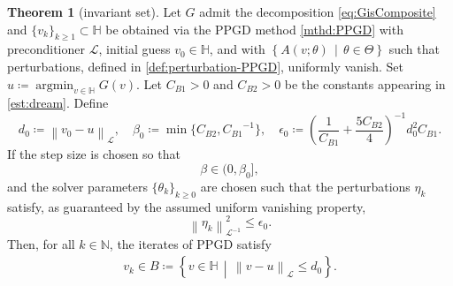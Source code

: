 \documentclass{amsart}
\DeclareMathOperator*{\argmin}{argmin}
\newcommand{\polN}{\mathbb N}
\newcommand{\vk}{{v_{k}}}
\newcommand{\LL}{\mathcal{L}}
\newcommand{\LLinv}{{\mathcal{L}^{-1}}}
\newcommand{\norm}[2]{\left\| #1 \right\| _{#2}}
\newcommand{\HH}{\mathbb{H}}
\newcommand{\s}{{\beta}}	%
\newcommand{\CdvB}{{C_{B1}}} %
\newcommand{\CddB}{{C_{B2}}} %
\theoremstyle{definition}
\newtheorem{thm}{Theorem}[section]
\begin{document}
	\begin{thm}[invariant set]
	\label{thm:invariant-set}
Let $G$ admit the decomposition \eqref{eq:GisComposite} and $\{v_k\}_{k\ge1} \subset \HH$ be obtained via the PPGD method \eqref{mthd:PPGD} with preconditioner $\LL$, initial guess $v_0\in \HH$, and with $\left\{A(v;\theta) \, \middle| \, \theta\in \Theta \right\}$ such that perturbations, defined in \eqref{def:perturbation-PPGD}, uniformly vanish. Set $u \coloneqq \argmin_{v\in\HH}G(v)$. Let $\CdvB>0$ and $\CddB>0$ be the constants appearing in \eqref{est:dream}. Define
	\[
d_0 \coloneqq \norm{v_0 - u}{\LL}, \quad \s_0 \coloneqq  \min\{\CddB, \CdvB^{-1} \} , \quad \epsilon_0 \coloneqq \left(\frac{1}{\CdvB} +\frac{5\CddB}{4} \right)^{-1} d_0^2 \CdvB.
	\]
If the step size is chosen so that
	\begin{equation}
	\label{est:sz-cond-invariant-set}
\s \in (0, \s_0],
	\end{equation}
and the solver parameters $\{\theta_k\}_{k\ge0}$ are chosen such that the perturbations $\eta_{k}$ satisfy, as guaranteed by the assumed uniform vanishing property,
	\begin{equation}
	\label{est:pert-cond-invariant-set}
\norm{\eta_{k}}{\LLinv}^2 \le \epsilon_0.
	\end{equation}
Then, for all $k \in \polN$, the iterates of PPGD satisfy
	\begin{align}
	\label{obj:invariant-set}
\vk \in B \coloneqq \left\{ v\in\HH \, \middle| \, \norm{v-u}{\LL} \le d_0  \right\}.
	\end{align}
	\end{thm}
		
\end{document}

